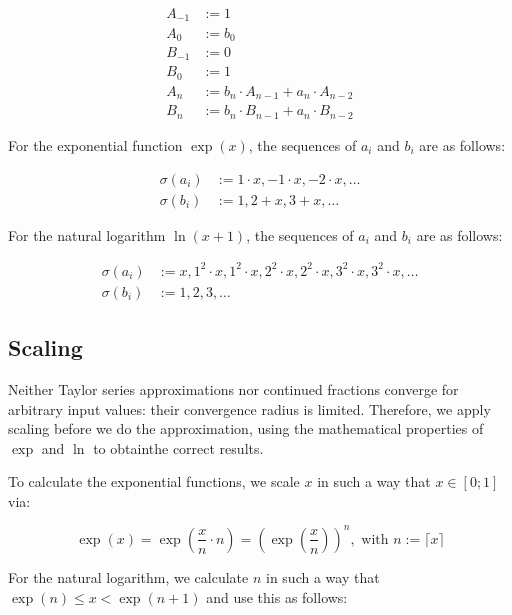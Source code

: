 \documentclass[11pt,a4paper,dvipsnames]{article}
\theoremstyle{definition}
\theoremstyle{definition}
\begin{document}
\begin{align*}
  A_{-1} & :=  1 \\
  A_{0} & :=  b_{0} \\
  B_{-1} & :=  0 \\
  B_{0} & := 1 \\
  A_{n} & :=  b_{n}\cdot A_{n-1} + a_{n}\cdot A_{n-2} \\
  B_{n} & :=  b_{n}\cdot B_{n-1} + a_{n}\cdot B_{n-2}
\end{align*}

For the exponential function $\exp(x)$, the sequences of $a_{i}$ and $b_{i}$ are
as follows:

\begin{align*}
  \sigma(a_{i}) & := 1 \cdot x, -1 \cdot x, -2 \cdot x, \ldots \\
  \sigma(b_{i}) & := 1, 2 + x, 3 + x, \ldots
\end{align*}

For the natural logarithm $\ln(x+1)$, the sequences of $a_{i}$ and $b_{i}$ are
as follows:

\begin{align*}
  \sigma(a_{i}) & := x, 1^{2}\cdot x, 1^{2}\cdot x, 2^{2}\cdot x, 2^{2}\cdot x, 3^{2}\cdot
          x, 3^{2}\cdot x, \ldots\\
  \sigma(b_{i}) & := 1, 2, 3, \ldots
\end{align*}

\subsection{Scaling}
\label{sec:scaling}

Neither Taylor series approximations nor continued fractions converge for arbitrary input
values: their convergence radius is limited. Therefore, we apply scaling before
we do the approximation, using the mathematical properties of $\exp$ and $\ln$
to obtainthe correct results.

To calculate the exponential functions, we scale $x$ in such a way that
$x \in [0; 1]$ via:

\begin{equation*}
  \exp(x) = \exp
  \left(
    \frac{x}{n}\cdot n
  \right) =
  {\left(
      \exp{
        \left(
          \frac{x}{n}
        \right)}
    \right)}^{n}, \text{ with } n := \lceil x \rceil
\end{equation*}

For the natural logarithm, we calculate $n$ in such a way that
$\exp(n) \leq x < \exp(n+1)$ and use this as follows:
\end{document}
